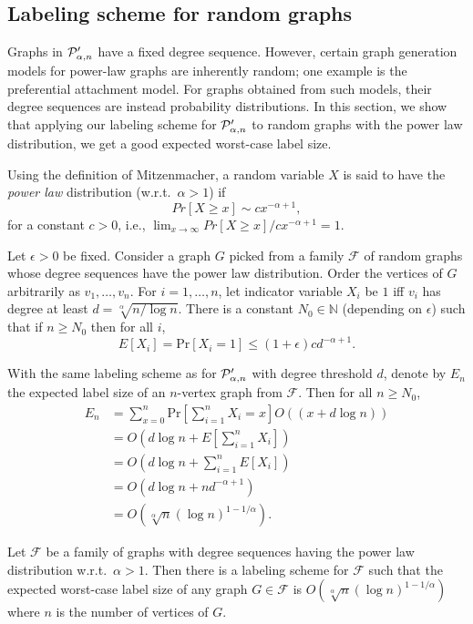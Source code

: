 \subsection{Labeling scheme for random graphs}
Graphs in $ \mathcal{P}'_{\alpha,n}$ have a fixed degree sequence. However, certain graph generation models for power-law graphs are inherently random; one example is the preferential attachment model. For graphs obtained from such models, their degree sequences are instead probability distributions. In this section, we show that applying our labeling scheme for $ \mathcal{P}'_{\alpha,n}$ to random graphs with the power law distribution, we get a good expected worst-case label size.

Using the definition of Mitzenmacher, a random variable $X$ is said to have the \emph{power law} distribution (w.r.t.~$\alpha > 1$) if
\[
  Pr[X\geq x] \sim cx^{-\alpha+1},
\]
for a constant $c > 0$, i.e., $\lim_{x\to\infty}Pr[X\geq x]/cx^{-\alpha+1} = 1$.

Let $\epsilon > 0$ be fixed. Consider a graph $G$ picked from a family $\mathcal F$ of random graphs whose degree sequences have the power law distribution. Order the vertices of $G$ arbitrarily as $v_1,\ldots,v_n$. For $i=1,\ldots,n$, let indicator variable $X_i$ be $1$ iff $v_i$ has degree at least $d = \sqrt[\alpha]{n/\log n}$. There is a constant $N_0\in\mathbb N$ (depending on $\epsilon$) such that if $n\geq N_0$ then for all $i$,
\[
  E[X_i] = \mbox{Pr}[X_i = 1]\leq (1+\epsilon)cd^{-\alpha+1}.
\]

With the same labeling scheme as for $ \mathcal{P}'_{\alpha,n}$ with degree threshold $d$, denote by $E_n$ the expected label size of an $n$-vertex graph from $\mathcal F$. Then for all $n\geq N_0$,
\begin{align*}
  E_n & = \sum_{x=0}^n \mbox{Pr}\left[\sum_{i=1}^n X_i = x\right]O((x+d\log n))\\
                       & = O\left(d\log n + E\left[\sum_{i=1}^n X_i\right]\right)\\
                       & = O\left(d\log n + \sum_{i=1}^n E[X_i]\right)\\
                       & = O\left(d\log n + nd^{-\alpha+1}\right)\\
                       & = O\left(\sqrt[\alpha]n(\log n)^{1-1/\alpha}\right).
\end{align*}
\begin{theorem}
Let $\mathcal F$ be a family of graphs with degree sequences having the power law distribution w.r.t.~$\alpha > 1$. Then there is a labeling scheme for $\mathcal F$ such that the expected worst-case label size of any graph $G\in\mathcal F$ is $O(\sqrt[\alpha]n(\log n)^{1-1/\alpha})$ where $n$ is the number of vertices of $G$.
\end{theorem}
